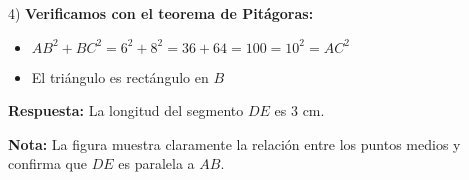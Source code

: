 \begin{ejercicio}
\begin{solucion}
4) \textbf{Verificamos con el teorema de Pitágoras:}
   \begin{itemize}
   \item $AB^2 + BC^2 = 6^2 + 8^2 = 36 + 64 = 100 = 10^2 = AC^2$
   \item El triángulo es rectángulo en $B$
   \end{itemize}

\textbf{Respuesta:} La longitud del segmento $DE$ es $3$ cm.

\textbf{Nota:} La figura muestra claramente la relación entre los puntos medios y confirma que $DE$ es paralela a $AB$.
\end{solucion}
\end{ejercicio}